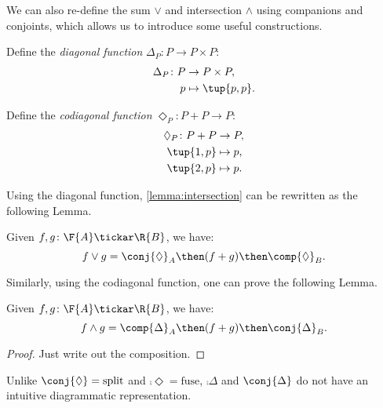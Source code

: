 We can also re-define the sum $\vee$ and intersection $\wedge$ using companions and conjoints, which allows us to introduce some useful constructions.

\begin{definition}
Define the \emph{diagonal function} $\Delta_P\colon P \to P \times P$:
\begin{equation}
\begin{aligned}
    \Delta_P \colon P & \to P \times P, \\
             p & \mapsto \tup{p, p}.
\end{aligned}
\end{equation}
\end{definition}

\begin{definition}
Define the \emph{codiagonal function} $\Diamond_P\colon P+P \to P $:
\begin{equation}
\begin{aligned}
    \Diamond_P \colon P + P & \to P,  \\
            \tup{1,p} & \mapsto p, \\
            \tup{2,p} & \mapsto p.
\end{aligned}
\end{equation}
\end{definition}

Using the diagonal function, \cref{lemma:intersection} can be rewritten as the following Lemma.

\begin{lemma}
    Given $f, g\colon \F{A} \tickar \R{B}$, we have:
    \begin{equation}
        f \vee g =  \conj{\Diamond}_A \then (f + g)\then \comp{\Diamond}_B.
    \end{equation}
\end{lemma}

Similarly, using the codiagonal function, one can prove the following Lemma.
\begin{lemma}
    Given $f, g\colon \F{A} \tickar \R{B}$, we have:
    \begin{equation}
        f \wedge g = \comp{\Delta}_A \then(f + g) \then \conj{\Delta}_B.
    \end{equation}
\end{lemma}
\begin{proof}Just write out the composition.\end{proof}
Unlike $\conj{\Diamond} = \text{split}$ and $\comp{\Diamond} = \text{fuse}$, $\comp{\Delta}$ and $\conj{\Delta}$ do not have an intuitive diagrammatic representation.
